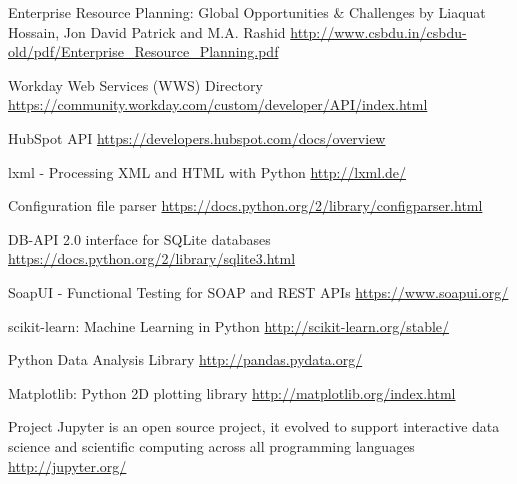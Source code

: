 \begin{thebibliography}{9}
	
	
	Enterprise Resource Planning: Global Opportunities \& Challenges
	by Liaquat Hossain, Jon David Patrick and M.A. Rashid 
	\url{http://www.csbdu.in/csbdu-old/pdf/Enterprise_Resource_Planning.pdf}
	 
	Workday Web Services (WWS) Directory
	\url{https://community.workday.com/custom/developer/API/index.html}
	
	HubSpot API
	\url{https://developers.hubspot.com/docs/overview}
	
	lxml - Processing XML and HTML with Python
	\url{http://lxml.de/}
	 
	 
	Configuration file parser
	\url{https://docs.python.org/2/library/configparser.html}
	 
	
	DB-API 2.0 interface for SQLite databases
	\url{https://docs.python.org/2/library/sqlite3.html}
	
	SoapUI - Functional Testing for SOAP and REST APIs
	\url{https://www.soapui.org/}

	scikit-learn: Machine Learning in Python
	\url{http://scikit-learn.org/stable/}
	
	Python Data Analysis Library
	\url{http://pandas.pydata.org/}
	
	Matplotlib: Python 2D plotting library
	\url{http://matplotlib.org/index.html}
		
	Project Jupyter is an open source project, it evolved to support interactive data science and scientific computing across all programming languages
	\url{http://jupyter.org/}
	
	
	
\end{thebibliography}